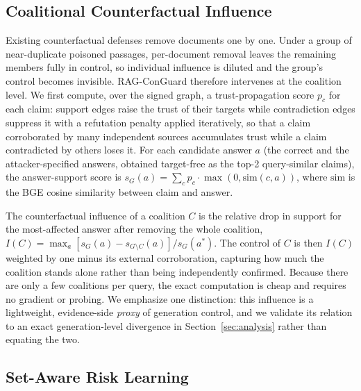 \documentclass[sigconf]{acmart}
\begin{document}
\subsection{Coalitional Counterfactual Influence}
\label{sec:influence}

Existing counterfactual defenses remove documents one by one. Under a group of near-duplicate poisoned passages, per-document removal leaves the remaining members fully in control, so individual influence is diluted and the group's control becomes invisible. RAG-ConGuard therefore intervenes at the coalition level. We first compute, over the signed graph, a trust-propagation score $p_c$ for each claim: support edges raise the trust of their targets while contradiction edges suppress it with a refutation penalty applied iteratively, so that a claim corroborated by many independent sources accumulates trust while a claim contradicted by others loses it. For each candidate answer $a$ (the correct and the attacker-specified answers, obtained target-free as the top-2 query-similar claims), the answer-support score is $s_G(a)=\sum_c p_c\cdot\max(0,\mathrm{sim}(c,a))$, where $\mathrm{sim}$ is the BGE cosine similarity between claim and answer.

The counterfactual influence of a coalition $C$ is the relative drop in support for the most-affected answer after removing the whole coalition, $I(C)=\max_a\left[s_G(a)-s_{G\setminus C}(a)\right]/s_G(a^\ast)$. The control of $C$ is then $I(C)$ weighted by one minus its external corroboration, capturing how much the coalition stands alone rather than being independently confirmed. Because there are only a few coalitions per query, the exact computation is cheap and requires no gradient or probing. We emphasize one distinction: this influence is a lightweight, evidence-side \textit{proxy} of generation control, and we validate its relation to an exact generation-level divergence in Section~\ref{sec:analysis} rather than equating the two.

\subsection{Set-Aware Risk Learning}
\label{sec:risk}
\end{document}
